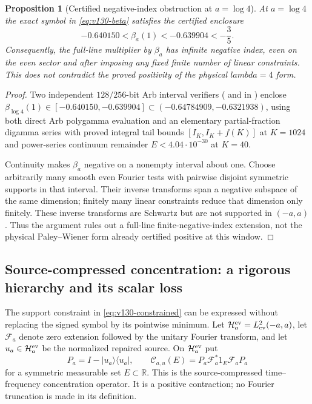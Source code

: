 \documentclass[11pt]{article}
\def\lambda{lambda}%
\newtheorem{proposition}[theorem]{Proposition}
\theoremstyle{remark}
\begin{document}
\begin{proposition}[Certified negative-index obstruction at $a=\log 4$]
\label{prop:v132-global-index}
At $a=\log4$ the exact symbol in \eqref{eq:v130-beta} satisfies the certified enclosure
\[
 -0.640150<\beta_a(1)<-0.639904<-\frac35.
\]
Consequently, the full-line multiplier by $\beta_a$ has infinite
negative index, even on the even sector and after imposing any fixed
finite number of linear constraints. This does not contradict the
proved positivity of the physical $\lambda=4$ form.
\end{proposition}
\begin{proof}
Two independent $128/256$-bit Arb interval verifiers ( and  in ) enclose $\beta_{\log 4}(1)\in [-0.640150,-0.639904]\subset (-0.64784909,-0.6321938)$, using both direct Arb polygamma evaluation and an elementary partial-fraction digamma series with proved integral tail bounds $[I_K,I_K+f(K)]$ at $K=1024$ and power-series continuum remainder $E<4.04\cdot 10^{-30}$ at $K=40$.

Continuity makes $\beta_a$ negative on a nonempty interval about one.
Choose arbitrarily many smooth even Fourier tests with pairwise
disjoint symmetric supports in that interval. Their inverse transforms
span a negative subspace of the same dimension; finitely many linear
constraints reduce that dimension only finitely. These inverse
transforms are Schwartz but are not supported in $(-a,a)$. Thus the
argument rules out a full-line finite-negative-index extension, not the
physical Paley--Wiener form already certified positive at this window.
\end{proof}

\subsection{Source-compressed concentration: a rigorous hierarchy and its scalar loss}

The support constraint in \eqref{eq:v130-constrained} can be expressed
without replacing the signed symbol by its pointwise minimum.  Let
$\mathcal H_a^{\rm ev}=L^2_{\rm ev}(-a,a)$, let $\mathcal F_a$ denote
zero extension followed by the unitary Fourier transform, and let
$u_a\in\mathcal H_a^{\rm ev}$ be the normalized repaired source.  On
$\mathcal H_a^{\rm ev}$ put
\[
 P_a=I-|u_a\rangle\langle u_a|,
 \qquad
 \mathcal C_{a,u}(E)
 =P_a\mathcal F_a^*1_E\mathcal F_aP_a
\]
for a symmetric measurable set $E\subset\mathbb R$.  This is the
source-compressed time--frequency concentration operator.  It is a
positive contraction; no Fourier truncation is made in its definition.
\end{document}
